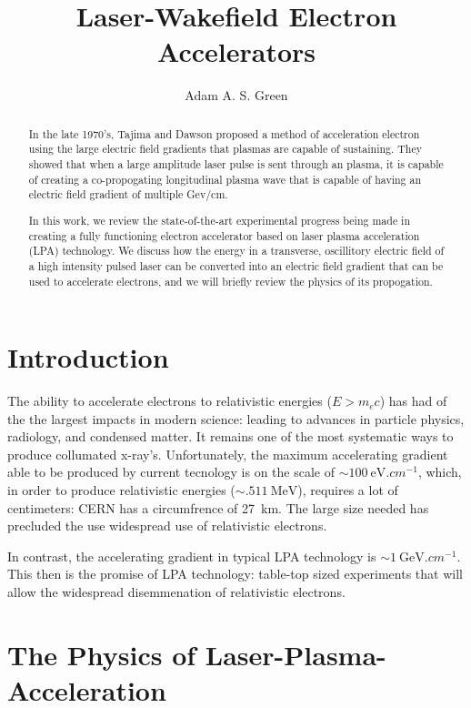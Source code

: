 \documentclass[12pt,letterpaper, titlepage]{article}
\title{Laser-Wakefield Electron Accelerators}
\author{Adam A. S. Green}
\begin{document}

\maketitle

\begin{abstract}
In the late 1970's, Tajima and Dawson proposed a method of acceleration 
electron
using the large electric field gradients that plasmas are capable of 
sustaining. They showed that when a large amplitude laser pulse is sent through 
an plasma, it is capable of creating a co-propogating longitudinal plasma wave 
that is capable of having an electric field gradient of multiple Gev/cm. 

In this work, we review the state-of-the-art experimental progress being made 
in creating a fully functioning electron accelerator based on laser plasma 
acceleration (LPA) technology. We discuss how the energy in a  transverse, 
oscillitory electric field of a high intensity pulsed laser can be converted 
into an electric field gradient that can be used to accelerate electrons, and 
we will briefly review the physics of its propogation.  \end{abstract}
\tableofcontents
\section{Introduction}
\label{sec:intro}
The ability to accelerate electrons to relativistic energies ($ E > m_e c$) has 
had of the the largest impacts in modern science: leading to advances in 
particle physics, radiology, and condensed matter.
It remains one of the most systematic ways to produce collumated x-ray's.
Unfortunately, the maximum accelerating gradient able to be produced by current 
tecnology is on the scale of $\sim \SI{100}{\electronvolt.cm^{-1}}$, which, in 
order to produce relativistic
energies ($\sim \SI{.511}{\mega\electronvolt}$), requires a lot
of centimeters: CERN has a circumfrence of \SI{27}{km}. The large size needed 
has precluded the use widespread use of relativistic electrons.

In contrast, the accelerating gradient in typical LPA technology is $\sim 
\SI{1}{\giga\electronvolt.cm^{-1}}$. This then is the promise of LPA technology: 
table-top sized experiments that will allow the widespread disemmenation of 
relativistic electrons. 
\section{The Physics of Laser-Plasma-Acceleration}
\end{document}

